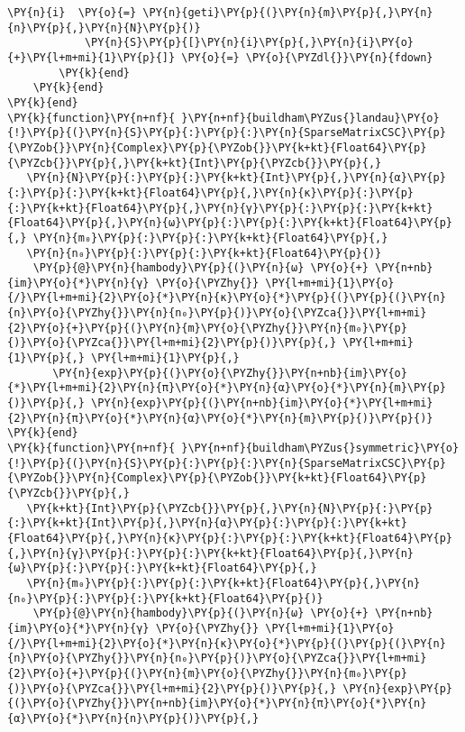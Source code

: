 \begin{Verbatim}[commandchars=\\\{\}]
            \PY{n}{i}  \PY{o}{=} \PY{n}{geti}\PY{p}{(}\PY{n}{m}\PY{p}{,}\PY{n}{n}\PY{p}{,}\PY{n}{N}\PY{p}{)}
            \PY{n}{S}\PY{p}{[}\PY{n}{i}\PY{p}{,}\PY{n}{i}\PY{o}{+}\PY{l+m+mi}{1}\PY{p}{]} \PY{o}{=} \PY{o}{\PYZdl{}}\PY{n}{fdown}
        \PY{k}{end}
    \PY{k}{end}
\PY{k}{end}
\PY{k}{function}\PY{n+nf}{ }\PY{n+nf}{buildham\PYZus{}landau}\PY{o}{!}\PY{p}{(}\PY{n}{S}\PY{p}{:}\PY{p}{:}\PY{n}{SparseMatrixCSC}\PY{p}{\PYZob{}}\PY{n}{Complex}\PY{p}{\PYZob{}}\PY{k+kt}{Float64}\PY{p}{\PYZcb{}}\PY{p}{,}\PY{k+kt}{Int}\PY{p}{\PYZcb{}}\PY{p}{,}
   \PY{n}{N}\PY{p}{:}\PY{p}{:}\PY{k+kt}{Int}\PY{p}{,}\PY{n}{α}\PY{p}{:}\PY{p}{:}\PY{k+kt}{Float64}\PY{p}{,}\PY{n}{κ}\PY{p}{:}\PY{p}{:}\PY{k+kt}{Float64}\PY{p}{,}\PY{n}{γ}\PY{p}{:}\PY{p}{:}\PY{k+kt}{Float64}\PY{p}{,}\PY{n}{ω}\PY{p}{:}\PY{p}{:}\PY{k+kt}{Float64}\PY{p}{,} \PY{n}{m₀}\PY{p}{:}\PY{p}{:}\PY{k+kt}{Float64}\PY{p}{,}
   \PY{n}{n₀}\PY{p}{:}\PY{p}{:}\PY{k+kt}{Float64}\PY{p}{)}
    \PY{p}{@}\PY{n}{hambody}\PY{p}{(}\PY{n}{ω} \PY{o}{+} \PY{n+nb}{im}\PY{o}{*}\PY{n}{γ} \PY{o}{\PYZhy{}} \PY{l+m+mi}{1}\PY{o}{/}\PY{l+m+mi}{2}\PY{o}{*}\PY{n}{κ}\PY{o}{*}\PY{p}{(}\PY{p}{(}\PY{n}{n}\PY{o}{\PYZhy{}}\PY{n}{n₀}\PY{p}{)}\PY{o}{\PYZca{}}\PY{l+m+mi}{2}\PY{o}{+}\PY{p}{(}\PY{n}{m}\PY{o}{\PYZhy{}}\PY{n}{m₀}\PY{p}{)}\PY{o}{\PYZca{}}\PY{l+m+mi}{2}\PY{p}{)}\PY{p}{,} \PY{l+m+mi}{1}\PY{p}{,} \PY{l+m+mi}{1}\PY{p}{,}
       \PY{n}{exp}\PY{p}{(}\PY{o}{\PYZhy{}}\PY{n+nb}{im}\PY{o}{*}\PY{l+m+mi}{2}\PY{n}{π}\PY{o}{*}\PY{n}{α}\PY{o}{*}\PY{n}{m}\PY{p}{)}\PY{p}{,} \PY{n}{exp}\PY{p}{(}\PY{n+nb}{im}\PY{o}{*}\PY{l+m+mi}{2}\PY{n}{π}\PY{o}{*}\PY{n}{α}\PY{o}{*}\PY{n}{m}\PY{p}{)}\PY{p}{)}
\PY{k}{end}
\PY{k}{function}\PY{n+nf}{ }\PY{n+nf}{buildham\PYZus{}symmetric}\PY{o}{!}\PY{p}{(}\PY{n}{S}\PY{p}{:}\PY{p}{:}\PY{n}{SparseMatrixCSC}\PY{p}{\PYZob{}}\PY{n}{Complex}\PY{p}{\PYZob{}}\PY{k+kt}{Float64}\PY{p}{\PYZcb{}}\PY{p}{,}
   \PY{k+kt}{Int}\PY{p}{\PYZcb{}}\PY{p}{,}\PY{n}{N}\PY{p}{:}\PY{p}{:}\PY{k+kt}{Int}\PY{p}{,}\PY{n}{α}\PY{p}{:}\PY{p}{:}\PY{k+kt}{Float64}\PY{p}{,}\PY{n}{κ}\PY{p}{:}\PY{p}{:}\PY{k+kt}{Float64}\PY{p}{,}\PY{n}{γ}\PY{p}{:}\PY{p}{:}\PY{k+kt}{Float64}\PY{p}{,}\PY{n}{ω}\PY{p}{:}\PY{p}{:}\PY{k+kt}{Float64}\PY{p}{,}
   \PY{n}{m₀}\PY{p}{:}\PY{p}{:}\PY{k+kt}{Float64}\PY{p}{,}\PY{n}{n₀}\PY{p}{:}\PY{p}{:}\PY{k+kt}{Float64}\PY{p}{)}
    \PY{p}{@}\PY{n}{hambody}\PY{p}{(}\PY{n}{ω} \PY{o}{+} \PY{n+nb}{im}\PY{o}{*}\PY{n}{γ} \PY{o}{\PYZhy{}} \PY{l+m+mi}{1}\PY{o}{/}\PY{l+m+mi}{2}\PY{o}{*}\PY{n}{κ}\PY{o}{*}\PY{p}{(}\PY{p}{(}\PY{n}{n}\PY{o}{\PYZhy{}}\PY{n}{n₀}\PY{p}{)}\PY{o}{\PYZca{}}\PY{l+m+mi}{2}\PY{o}{+}\PY{p}{(}\PY{n}{m}\PY{o}{\PYZhy{}}\PY{n}{m₀}\PY{p}{)}\PY{o}{\PYZca{}}\PY{l+m+mi}{2}\PY{p}{)}\PY{p}{,} \PY{n}{exp}\PY{p}{(}\PY{o}{\PYZhy{}}\PY{n+nb}{im}\PY{o}{*}\PY{n}{π}\PY{o}{*}\PY{n}{α}\PY{o}{*}\PY{n}{n}\PY{p}{)}\PY{p}{,}

\end{Verbatim}
